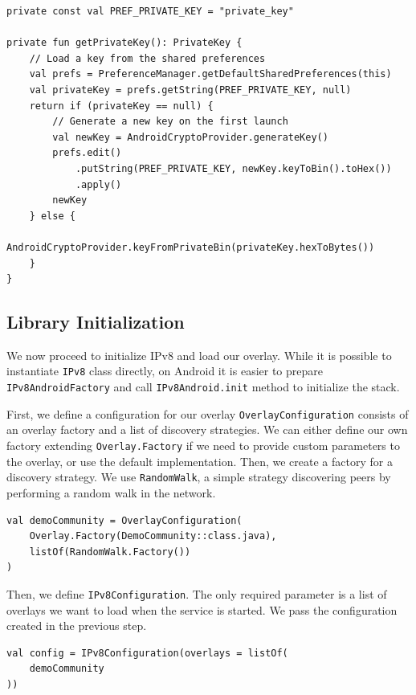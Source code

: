 \begin{verbatim}
private const val PREF_PRIVATE_KEY = "private_key"

private fun getPrivateKey(): PrivateKey {
    // Load a key from the shared preferences
    val prefs = PreferenceManager.getDefaultSharedPreferences(this)
    val privateKey = prefs.getString(PREF_PRIVATE_KEY, null)
    return if (privateKey == null) {
        // Generate a new key on the first launch
        val newKey = AndroidCryptoProvider.generateKey()
        prefs.edit()
            .putString(PREF_PRIVATE_KEY, newKey.keyToBin().toHex())
            .apply()
        newKey
    } else {
        AndroidCryptoProvider.keyFromPrivateBin(privateKey.hexToBytes())
    }
}
\end{verbatim}


\subsection{Library Initialization}

We now proceed to initialize IPv8 and load our overlay. While it is possible to instantiate \texttt{IPv8} class directly, on Android it is easier to prepare \texttt{IPv8AndroidFactory} and call \texttt{IPv8Android.init} method to initialize the stack.

First, we define a configuration for our overlay \texttt{OverlayConfiguration} consists of an overlay factory and a list of discovery strategies. We can either define our own factory extending \texttt{Overlay.Factory} if we need to provide custom parameters to the overlay, or use the default implementation. Then, we create a factory for a discovery strategy. We use \texttt{RandomWalk}, a simple strategy discovering peers by performing a random walk in the network.

\begin{verbatim}
val demoCommunity = OverlayConfiguration(
    Overlay.Factory(DemoCommunity::class.java),
    listOf(RandomWalk.Factory())
)
\end{verbatim}

Then, we define \texttt{IPv8Configuration}. The only required parameter is a list of overlays we want to load when the service is started. We pass the configuration created in the previous step.

\begin{verbatim}
val config = IPv8Configuration(overlays = listOf(
    demoCommunity
))
\end{verbatim}

